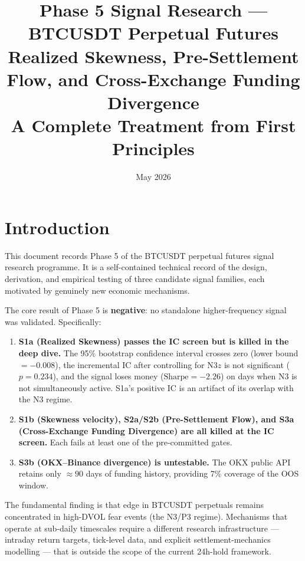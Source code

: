 \documentclass[12pt, a4paper]{article}
\title{\textbf{Phase 5 Signal Research --- BTCUSDT Perpetual Futures}\\[0.4em]
\large Realized Skewness, Pre-Settlement Flow, and Cross-Exchange Funding Divergence\\[0.3em]
\large A Complete Treatment from First Principles}
\author{}
\date{May 2026}
\theoremstyle{plain}
\theoremstyle{definition}
\begin{document}
\maketitle
\tableofcontents
\newpage

\section{Introduction}

This document records Phase 5 of the BTCUSDT perpetual futures signal
research programme.  It is a self-contained technical record of the
design, derivation, and empirical testing of three candidate signal
families, each motivated by genuinely new economic mechanisms.

The core result of Phase 5 is \textbf{negative}: no standalone
higher-frequency signal was validated.  Specifically:

\begin{enumerate}
  \item \textbf{S1a (Realized Skewness) passes the IC screen but is
        killed in the deep dive.}  The 95\% bootstrap confidence interval
        crosses zero (lower bound $= -0.008$), the incremental IC after
        controlling for N3$z$ is not significant ($p = 0.234$), and the
        signal loses money ($\text{Sharpe} = -2.26$) on days when N3 is
        not simultaneously active.  S1a's positive IC is an artifact of
        its overlap with the N3 regime.

  \item \textbf{S1b (Skewness velocity), S2a/S2b (Pre-Settlement Flow),
        and S3a (Cross-Exchange Funding Divergence) are all killed at the
        IC screen.}  Each fails at least one of the pre-committed gates.

  \item \textbf{S3b (OKX--Binance divergence) is untestable.}  The OKX
        public API retains only $\approx 90$ days of funding history,
        providing 7\% coverage of the OOS window.
\end{enumerate}

The fundamental finding is that edge in BTCUSDT perpetuals remains
concentrated in high-DVOL fear events (the N3/P3 regime).  Mechanisms
that operate at sub-daily timescales require a different research
infrastructure --- intraday return targets, tick-level data, and explicit
settlement-mechanics modelling --- that is outside the scope of the
current 24h-hold framework.
\end{document}
